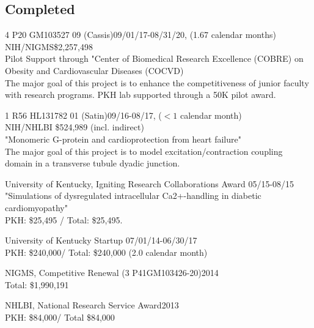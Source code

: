 
\subsection{Completed} 
\vspace{-10pt}

4 P20 GM103527	09 (Cassis)\dacoi \hfill 09/01/17-08/31/20,  (1.67 calendar months) \\
NIH/NIGMS\hfill \$2,257,498\\
Pilot Support through "Center of Biomedical Research Excellence (COBRE) on Obesity and Cardiovascular Diseases (COCVD)\\
The major goal of this project is to enhance the competitiveness of junior faculty with research programs. 
PKH lab supported through a 50K pilot award. %


1	R56	HL131782	01 (Satin)\dacoi\hfill 09/16-08/17, ($<1$ calendar month)\\
NIH/NHLBI \hfill \$524,989 (incl. indirect)\\
"Monomeric G-protein and cardioprotection from heart failure"\\
The major goal of this project is to model excitation/contraction coupling domain in a transverse tubule dyadic junction. 

University of Kentucky, Igniting Research Collaborations Award \dapi \hfill 05/15-08/15 \\
"Simulations of dysregulated intracellular Ca2+-handling in diabetic cardiomyopathy"  \\
PKH: \$25,495 / Total: \$25,495.

University of Kentucky Startup \dapi \hfill 07/01/14-06/30/17 \\
PKH: \$240,000/ Total: \$240,000 (2.0 calendar month)


NIGMS, Competitive Renewal (3 P41GM103426-20)\dasig\hfill 2014 \\
Total: \$1,990,191 

NHLBI, National Research Service Award\dapi  \hfill 2013 \\  %
PKH: \$84,000/ Total \$84,000


